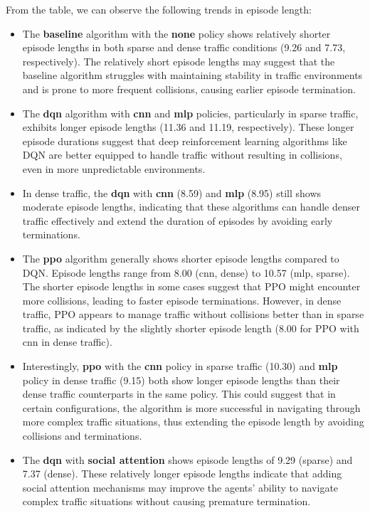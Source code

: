 From the table, we can observe the following trends in episode length:

\begin{itemize}
    \item The \textbf{baseline} algorithm with the \textbf{none} policy shows relatively shorter episode lengths in both sparse and dense traffic conditions (9.26 and 7.73, respectively). The relatively short episode lengths may suggest that the baseline algorithm struggles with maintaining stability in traffic environments and is prone to more frequent collisions, causing earlier episode termination.
    \item The \textbf{dqn} algorithm with \textbf{cnn} and \textbf{mlp} policies, particularly in sparse traffic, exhibits longer episode lengths (11.36 and 11.19, respectively). These longer episode durations suggest that deep reinforcement learning algorithms like DQN are better equipped to handle traffic without resulting in collisions, even in more unpredictable environments.
    \item In dense traffic, the \textbf{dqn} with \textbf{cnn} (8.59) and \textbf{mlp} (8.95) still shows moderate episode lengths, indicating that these algorithms can handle denser traffic effectively and extend the duration of episodes by avoiding early terminations.
    \item The \textbf{ppo} algorithm generally shows shorter episode lengths compared to DQN. Episode lengths range from 8.00 (cnn, dense) to 10.57 (mlp, sparse). The shorter episode lengths in some cases suggest that PPO might encounter more collisions, leading to faster episode terminations. However, in dense traffic, PPO appears to manage traffic without collisions better than in sparse traffic, as indicated by the slightly shorter episode length (8.00 for PPO with cnn in dense traffic).
    \item Interestingly, \textbf{ppo} with the \textbf{cnn} policy in sparse traffic (10.30) and \textbf{mlp} policy in dense traffic (9.15) both show longer episode lengths than their dense traffic counterparts in the same policy. This could suggest that in certain configurations, the algorithm is more successful in navigating through more complex traffic situations, thus extending the episode length by avoiding collisions and terminations.
    \item The \textbf{dqn} with \textbf{social attention} shows episode lengths of 9.29 (sparse) and 7.37 (dense). These relatively longer episode lengths indicate that adding social attention mechanisms may improve the agents' ability to navigate complex traffic situations without causing premature termination.
\end{itemize}

